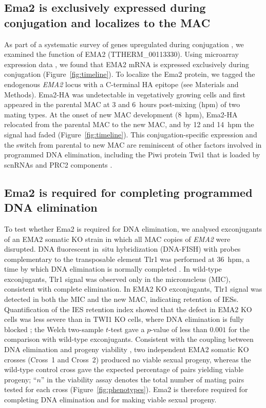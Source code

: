 \documentclass[11pt]{article}
\begin{document}
\subsection{Ema2 is exclusively expressed during conjugation and localizes
to the MAC}

As part of a systematic survey of genes upregulated during conjugation
\citep{loidl2021meiosis,miao2009microarray}, we examined the function of
EMA2 (TTHERM\_00113330). Using microarray expression data
\citep{miao2009microarray}, we found that EMA2 mRNA is expressed
exclusively during conjugation (Figure~\ref{fig:timeline}). To localize the
Ema2 protein, we tagged the endogenous \emph{EMA2} locus with a C-terminal
HA epitope (see Materials and Methods). Ema2-HA was undetectable in
vegetatively growing cells and first appeared in the parental MAC at 3 and
6~hours post-mixing (hpm) of two mating types. At the onset of new MAC
development (8~hpm), Ema2-HA relocated from the parental MAC to the new
MAC, and by 12 and 14~hpm the signal had faded
(Figure~\ref{fig:timeline}). This conjugation-specific expression and the
switch from parental to new MAC are reminiscent of other factors involved
in programmed DNA elimination, including the Piwi protein Twi1 that is
loaded by scnRNAs \citep{mochizuki2002twi1,noto2010giw1} and PRC2
components \citep{liu2007rnai}.

\subsection{Ema2 is required for completing programmed DNA elimination}

To test whether Ema2 is required for DNA elimination, we analysed
exconjugants of an EMA2 somatic KO strain in which all MAC copies of
\emph{EMA2} were disrupted. DNA fluorescent in~situ hybridization (DNA-FISH)
with probes complementary to the transposable element Tlr1
\citep{cheng2010transposase} was performed at 36~hpm, a time by which DNA
elimination is normally completed \citep{chalker2011ciliate}. In wild-type
exconjugants, Tlr1 signal was observed only in the micronucleus (MIC),
consistent with complete elimination. In EMA2 KO exconjugants, Tlr1 signal
was detected in both the MIC and the new MAC, indicating retention of
IESs. Quantification of the IES retention index showed that the defect in
EMA2 KO cells was less severe than in TWI1 KO cells, where DNA elimination
is fully blocked \citep{mochizuki2002twi1}; the Welch two-sample $t$-test
gave a $p$-value of less than $0.001$ for the comparison with wild-type
exconjugants. Consistent with the coupling between DNA elimination and
progeny viability \citep{cheng2010transposase}, two independent EMA2
somatic KO crosses (Cross~1 and Cross~2) produced no viable sexual
progeny, whereas the wild-type control cross gave the expected percentage
of pairs yielding viable progeny; ``$n$'' in the viability assay denotes
the total number of mating pairs tested for each cross
(Figure~\ref{fig:phenotypes}). Ema2 is therefore required for completing
DNA elimination and for making viable sexual progeny.
\end{document}
